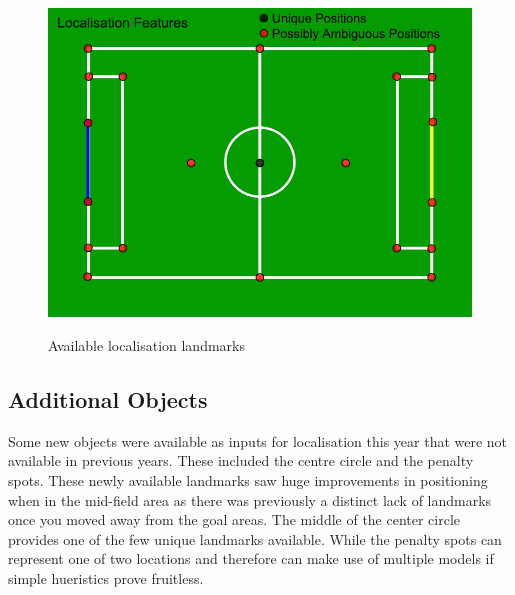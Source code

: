 \begin{figure}[htpb]
\begin{center}
   \leavevmode
    \scalebox{0.5} {\includegraphics{figs/LocalisationPoints.png} }
    \caption{Available localisation landmarks}
    \label{fig:LocalisationPoints}
\end{center}
\end{figure}

\subsection{Additional Objects}
Some new objects were available as inputs for localisation this year that were not available in previous years. These included the centre circle and the penalty spots. These newly available landmarks saw huge improvements in positioning when in the mid-field area as there was previously a distinct lack of landmarks once you moved away from the goal areas. The middle of the center circle provides one of the few unique landmarks available. While the penalty spots can represent one of two locations and therefore can make use of multiple models if simple hueristics prove fruitless.
